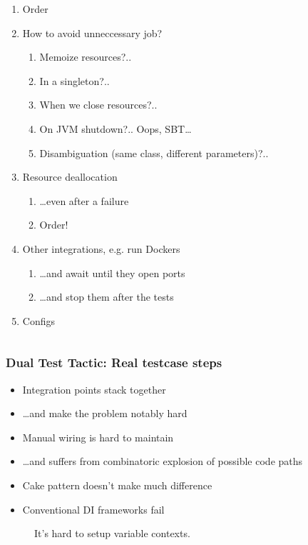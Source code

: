 \documentclass[usenames,dvipsnames,aspectratio=169]{beamer}
\begin{document}
\begin{frame}
\begin{columns}
  \begin{column}[T]{0.6\textwidth}
  \vspace{-0.3cm}
  \begin{enumerate}
  \item Order
  \item How to avoid unneccessary job?
    \begin{enumerate}
    \item Memoize resources?..
    \item In a singleton?..
    \item When we close resources?..
    \item On JVM shutdown?.. Oops, SBT\dots
    \item Disambiguation (same class, different parameters)?..
    \end{enumerate}
  \item Resource deallocation
    \begin{enumerate}
    \item \dots even after a failure
    \item Order!
    \end{enumerate}
  \item Other integrations, e.g. run Dockers
    \begin{enumerate}
      \item \dots and await until they open ports
      \item \dots and stop them after the tests
    \end{enumerate}
  \item Configs
  \end{enumerate}
  \end{column}
  \end{columns}


\end{frame}

\begin{frame}
  \frametitle{Dual Test Tactic: Real testcase steps}

  \begin{itemize}
  \item Integration points stack together
  \item \dots and make the problem notably hard

  \item Manual wiring is hard to maintain
  \item \dots and suffers from combinatoric explosion of possible code paths
  \item Cake pattern doesn't make much difference
  \item Conventional DI frameworks fail
  \end{itemize}

  \begin{figure}
  \Large It's hard to setup variable contexts.
  \end{figure}
\end{frame}
\end{document}
